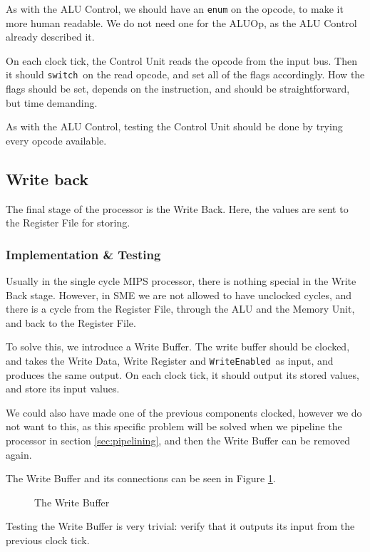 As with the ALU Control, we should have an \texttt{enum} on the opcode, to make
it more human readable. We do not need one for the ALUOp, as the ALU Control
already described it.

On each clock tick, the Control Unit reads the opcode from the input bus. Then
it should \texttt{switch} on the read opcode, and set all of the flags
accordingly. How the flags should be set, depends on the instruction, and
should be straightforward, but time demanding.

As with the ALU Control, testing the Control Unit should be done by trying
every opcode available.

\subsection{Write back}
The final stage of the processor is the Write Back. Here, the values are sent
to the Register File for storing.

\subsubsection*{Implementation \& Testing}
Usually in the single cycle MIPS processor, there is nothing special in the
Write Back stage. However, in SME we are not allowed to have unclocked cycles,
and there is a cycle from the Register File, through the ALU and the Memory
Unit, and back to the Register File.

To solve this, we introduce a Write Buffer. The write buffer should be clocked,
and takes the Write Data, Write Register and \texttt{WriteEnabled} as input,
and produces the same output. On each clock tick, it should output its stored
values, and store its input values.

We could also have made one of the previous components clocked, however we do
not want to this, as this specific problem will be solved when we pipeline the
processor in section \ref{sec:pipelining}, and then the Write Buffer can be
removed again.

The Write Buffer and its connections can be seen in Figure \ref{fig:wb}.
\begin{figure}
    \centering
    \caption{The Write Buffer}
    \label{fig:wb}
\end{figure}
Testing the Write Buffer is very trivial: verify that it outputs its input from
the previous clock tick.
